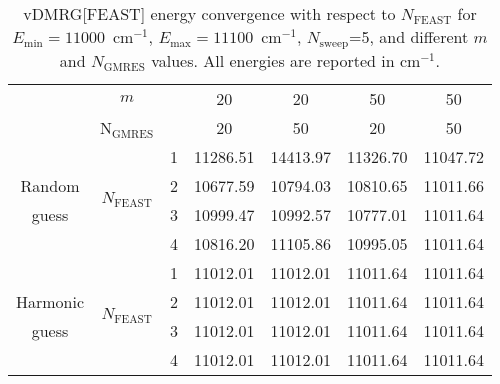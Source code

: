 \documentclass[journal=jctcce]{achemso}
\begin{document}
\begin{table}[htbp!]
  \centering
  \def\arraystretch{1.5}
  \begin{tabular}{ccc|cccc}
  	\hline \hline
  	              &      $m$                          &       &     20      &      20     &     50     &      50     \\
  	              & N$_\text{GMRES}$                  &       &     20      &      50     &     20     &      50     \\
  	\hline
  	              & \multirow{4}{*}{$N_\text{FEAST}$} &   1   &   11286.51  &   14413.97  &  11326.70  &   11047.72  \\
  	Random        &                                   &   2   &   10677.59  &   10794.03  &  10810.65  &   11011.66  \\
  	guess         &                                   &   3   &   10999.47  &   10992.57  &  10777.01  &   11011.64  \\
  	              &                                   &   4   &   10816.20  &   11105.86  &  10995.05  &   11011.64  \\
  	\hline
  	              & \multirow{4}{*}{$N_\text{FEAST}$} &   1   &   11012.01  &   11012.01  &  11011.64  &   11011.64  \\
  	Harmonic      &                                   &   2   &   11012.01  &   11012.01  &  11011.64  &   11011.64  \\
  	guess         &                                   &   3   &   11012.01  &   11012.01  &  11011.64  &   11011.64  \\
  	              &                                   &   4   &   11012.01  &   11012.01  &  11011.64  &   11011.64  \\ 
  	\hline
  	\hline
  \end{tabular}
  \caption{vDMRG[FEAST] energy convergence with respect to $N_\text{FEAST}$ for $E_\text{min}=11000$~cm$^{-1}$, $E_\text{max}=11100$~cm$^{-1}$, $N_\text{sweep}$=5, and different $m$ and $N_\text{GMRES}$ values.
  All energies are reported in cm$^{-1}$.}
  \label{tab:ZPVE_FEAST_C2H4}
\end{table}
\end{document}

